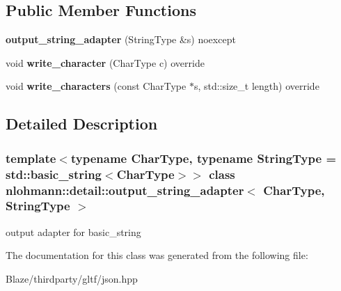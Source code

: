 \subsection*{Public Member Functions}
\begin{DoxyCompactItemize}
\item 
\mbox{\label{classnlohmann_1_1detail_1_1output__string__adapter_af3a49ecd0d23fe56ac21e13d8752abc7}} 
{\bfseries output\+\_\+string\+\_\+adapter} (String\+Type \&s) noexcept
\item 
\mbox{\label{classnlohmann_1_1detail_1_1output__string__adapter_a2d76cc6c88ddbc196a63fcfcac9ee7d1}} 
void {\bfseries write\+\_\+character} (Char\+Type c) override
\item 
\mbox{\label{classnlohmann_1_1detail_1_1output__string__adapter_ab5ea4da075305d225dfd84ad997e8747}} 
void {\bfseries write\+\_\+characters} (const Char\+Type $\ast$s, std\+::size\+\_\+t length) override
\end{DoxyCompactItemize}


\subsection{Detailed Description}
\subsubsection*{template$<$typename Char\+Type, typename String\+Type = std\+::basic\+\_\+string$<$\+Char\+Type$>$$>$\newline
class nlohmann\+::detail\+::output\+\_\+string\+\_\+adapter$<$ Char\+Type, String\+Type $>$}

output adapter for basic\+\_\+string 

The documentation for this class was generated from the following file\+:\begin{DoxyCompactItemize}
\item 
Blaze/thirdparty/gltf/json.\+hpp\end{DoxyCompactItemize}
